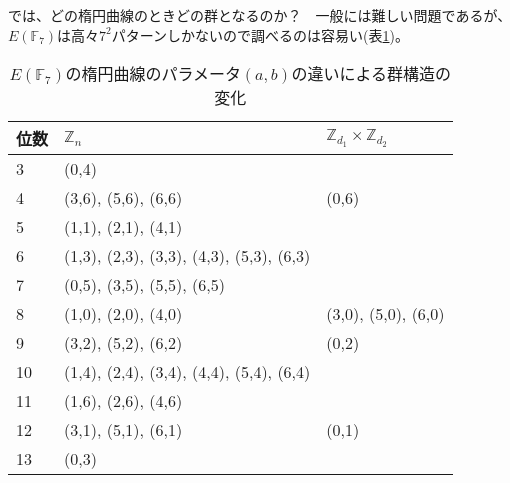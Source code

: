 では、どの楕円曲線のときどの群となるのか？　一般には難しい問題であるが、$E(\mathbb{F}_7)$は高々$7^2$パターンしかないので調べるのは容易い(表\ref{table:EFF_7})。

\begin{table}[htb]\label{table:EFF_7}
\begin{center}
\caption{$E(\mathbb{F}_7)$の楕円曲線のパラメータ$(a,b)$の違いによる群構造の変化}
\begin{tabular}{|l|l|l|}\hline
位数 & $\mathbb{Z}_n$                         & $\mathbb{Z}_{d_1}\times\mathbb{Z}_{d_2}$ \\\hline\hline
3  & (0,4)                                    &                                          \\\hline
4  & (3,6), (5,6), (6,6)                      & (0,6)                                    \\\hline
5  & (1,1), (2,1), (4,1)                      &                                          \\\hline
6  & (1,3), (2,3), (3,3), (4,3), (5,3), (6,3) &                                          \\\hline
7  & (0,5), (3,5), (5,5), (6,5)               &                                          \\\hline
8  & (1,0), (2,0), (4,0)                      & (3,0), (5,0), (6,0)                      \\\hline
9  & (3,2), (5,2), (6,2)                      & (0,2)                                    \\\hline
10 & (1,4), (2,4), (3,4), (4,4), (5,4), (6,4) &                                          \\\hline
11 & (1,6), (2,6), (4,6)                      &                                          \\\hline
12 & (3,1), (5,1), (6,1)                      & (0,1)                                    \\\hline
13 & (0,3)                                    &                                          \\\hline
\end{tabular}
\end{center}
\end{table}
